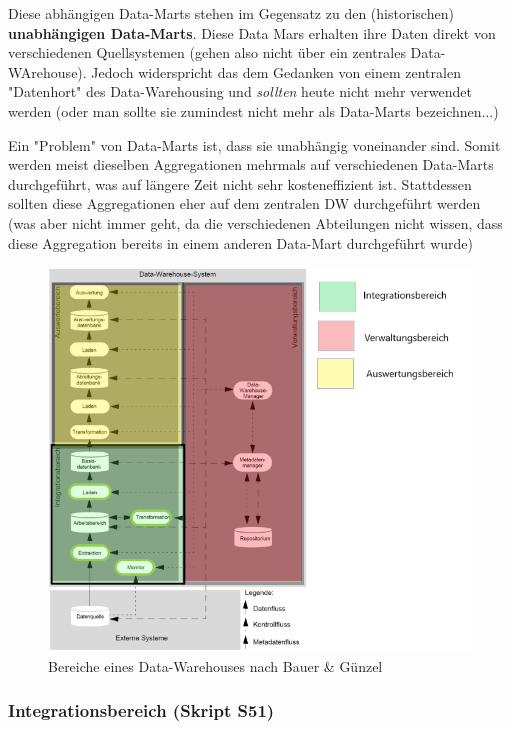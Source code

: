 \documentclass[a4paper, 11pt]{article}
\begin{document}
 Diese abhängigen Data-Marts stehen im Gegensatz zu den (historischen) \textbf{unabhängigen Data-Marts}. Diese Data Mars erhalten ihre Daten direkt von verschiedenen Quellsystemen (gehen also nicht über ein zentrales Data-WArehouse). Jedoch widerspricht das dem Gedanken von einem zentralen "Datenhort" des Data-Warehousing und \textit{sollten} heute nicht mehr verwendet werden (oder man sollte sie zumindest nicht mehr als Data-Marts bezeichnen...)

Ein "Problem" von Data-Marts ist, dass sie unabhängig voneinander sind. Somit werden meist dieselben Aggregationen mehrmals auf verschiedenen Data-Marts durchgeführt, was auf längere Zeit nicht sehr kosteneffizient ist. Stattdessen sollten diese Aggregationen eher auf dem zentralen DW durchgeführt werden (was aber nicht immer geht, da die verschiedenen Abteilungen nicht wissen, dass diese Aggregation bereits in einem anderen Data-Mart durchgeführt wurde)

\begin{figure}[htb]
	\centering
	\includegraphics[keepaspectratio=true,height=18\baselineskip]{DWH_Bereiche.png}
	\caption{Bereiche eines Data-Warehouses nach Bauer \& Günzel}
	\label{fig:bereiche}
\end{figure}

\subsubsection{Integrationsbereich (Skript S51)}
\end{document}
